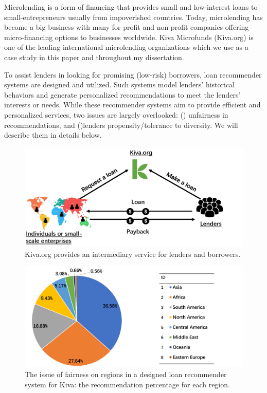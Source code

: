 Microlending is a form of financing that provides small and low-interest loans to small-entrepreneurs usually from impoverished countries. Today, microlending has become a big business with many for-profit and non-profit companies offering micro-financing options to businesses worldwide. Kiva Microfunds (Kiva.org) is one of the leading international microlending organizations which we use as a case study in this paper and throughout my dissertation.

To assist lenders in looking for promising (low-risk) borrowers, loan recommender systems \cite{choo2014gather,choo2014understanding} are designed and utilized. Such systems model lenders' historical behaviors and generate personalized recommendations to meet the lenders' interests or needs. While these recommender systems aim to provide efficient and personalized services, two issues are largely overlooked: () unfairness in recommendations, and ()lenders propensity/tolerance to diversity. We will describe them in details below. 

\begin{figure}[htb]
\includegraphics[width=0.98\columnwidth]{imgs/far/microlending.png}
\caption{Kiva.org provides an intermediary service for lenders and borrowers.}
\label{fig:kiva_process}
\end{figure}

\begin{figure}[htb]
\includegraphics[width=0.98\columnwidth]{imgs/far/kiva.png}
\caption{The issue of fairness on regions in a designed loan recommender system \cite{choo2014gather} for Kiva: the recommendation percentage for each region.}
\label{fig:recom_result}
\end{figure}

